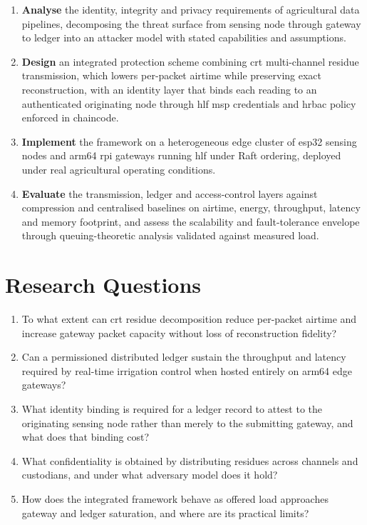 \documentclass[12pt,a4paper,oneside]{book}
\begin{document}
\begin{enumerate}
  \item \textbf{Analyse} the identity, integrity and privacy requirements of
        agricultural data pipelines, decomposing the threat surface from
        sensing node through gateway to ledger into an attacker model with
        stated capabilities and assumptions.

  \item \textbf{Design} an integrated protection scheme combining \gls{crt}
        multi-channel residue transmission, which lowers per-packet airtime
        while preserving exact reconstruction, with an identity layer that
        binds each reading to an authenticated originating node through
        \gls{hlf} \gls{msp} credentials and \gls{hrbac} policy enforced in
        chaincode.

  \item \textbf{Implement} the framework on a heterogeneous edge cluster of
        \gls{esp32} sensing nodes and \gls{arm64} \gls{rpi} gateways running
        \gls{hlf} under Raft ordering, deployed under real agricultural
        operating conditions.

  \item \textbf{Evaluate} the transmission, ledger and access-control layers
        against compression and centralised baselines on airtime, energy,
        throughput, latency and memory footprint, and assess the scalability
        and fault-tolerance envelope through queuing-theoretic analysis
        validated against measured load.
\end{enumerate}

\section{Research Questions}
\label{sec:research_questions}

\begin{enumerate}[label=\textbf{RQ\arabic*.}]
  \item To what extent can \gls{crt} residue decomposition reduce per-packet
        airtime and increase gateway packet capacity without loss of
        reconstruction fidelity?
  \item Can a permissioned distributed ledger sustain the throughput and latency
        required by real-time irrigation control when hosted entirely on
        \gls{arm64} edge gateways?
  \item What identity binding is required for a ledger record to attest to the
        originating sensing node rather than merely to the submitting gateway,
        and what does that binding cost?
  \item What confidentiality is obtained by distributing residues across
        channels and custodians, and under what adversary model does it hold?
  \item How does the integrated framework behave as offered load approaches
        gateway and ledger saturation, and where are its practical limits?
\end{enumerate}
\end{document}
